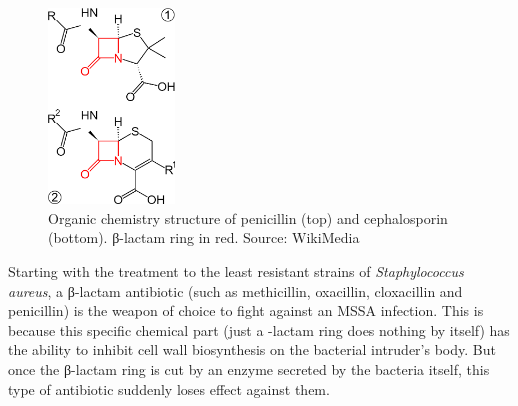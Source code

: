 \paragraph{}\begin{figure}\begin{center}\includegraphics[width=0.30\textwidth]{assets/beta-lactam.png}\end{center}\caption{Organic chemistry structure of penicillin (top) and cephalosporin (bottom). β-lactam ring in red. Source: WikiMedia}\vspace{-0.30\linewidth}\end{figure}Starting with the treatment to the least resistant strains of \emph{Staphylococcus aureus}, a β-lactam antibiotic (such as methicillin, oxacillin, cloxacillin and penicillin) is the weapon of choice to fight against an MSSA infection. This is because this specific chemical part (just a \beta-lactam ring does nothing by itself) has the ability to inhibit cell wall biosynthesis on the bacterial intruder's body. But once the β-lactam ring is cut by an enzyme secreted by the bacteria itself, this type of antibiotic suddenly loses effect against them.

